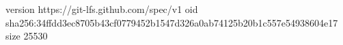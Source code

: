 version https://git-lfs.github.com/spec/v1
oid sha256:34ffdd3ec8705b43cf0779452b1547d326a0ab74125b20b1c557e54938604e17
size 25530
